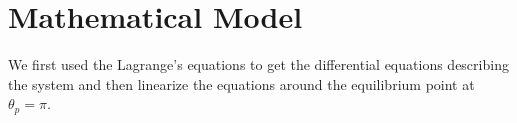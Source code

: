 




\section{Mathematical Model}
We first used the Lagrange's equations to get the differential equations describing the system and then linearize the equations around the equilibrium point at $\theta_p=\pi$.
